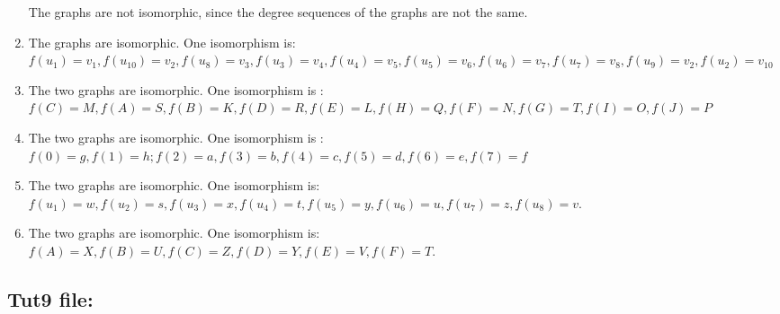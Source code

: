 \documentclass[a4paper]{article}
\begin{document}
\begin{enumerate}[label = \alph*)]
		      The graphs are not isomorphic, since the degree sequences of the graphs are not the same.
		\item The graphs are isomorphic. One isomorphism is: \\
		      $f(u_1)=v_1,f(u_{10})=v_2,f(u_8)=v_3,f(u_3)=v_4,f(u_4)=v_5,f(u_5)=v_6,f(u_6)=v_7,f(u_7)=v_8,f(u_9)=v_2,f(u_2)=v_{10}$
		\item The two graphs are isomorphic. One isomorphism is : \\
		      $f(C)=M,f(A)=S,f(B)=K,f(D)=R,f(E)=L,f(H)=Q, f(F)=N ,f(G)=T,f(I)=O,f(J)=P$
		\item The two graphs are isomorphic. One isomorphism is : \\
		      $f(0)=g,f(1)=h;f(2)=a,f(3)=b,f(4)=c,f(5)=d,f(6)=e,f(7)=f$
		\item  The two graphs are isomorphic. One isomorphism is:\\ $f(u_1) = w, f(u_2) = s, f(u_3) = x,f(u_4) = t, f(u_5) = y, f(u_6)=u, f(u_7) = z , f(u_8) = v $.
		\item The two graphs are isomorphic. One isomorphism is:\\ $f(A) = X, f(B) = U, f(C) = Z,f(D) = Y, f(E) = V, f(F) = T  $.
	\end{enumerate}
	
	
	
	
	
	\subsection*{Tut9 file:}
\end{document}
